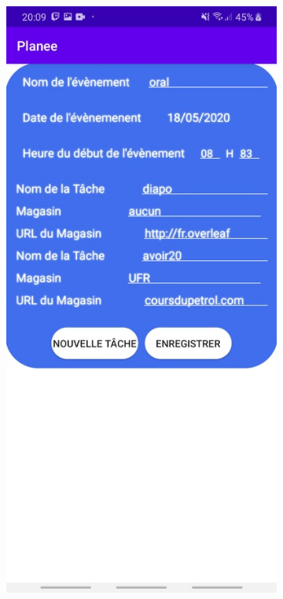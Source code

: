 \documentclass[12pt,a4paper]{report}
\begin{document}
\begin{flushleft}
\begin{figure}[!h]
\begin{subfigure}[b]{0.3\textwidth}
        \includegraphics[width=\textwidth]{FormUpdateNoModif}

\end{subfigure}
\end{figure}
\end{flushleft}
\end{document}
